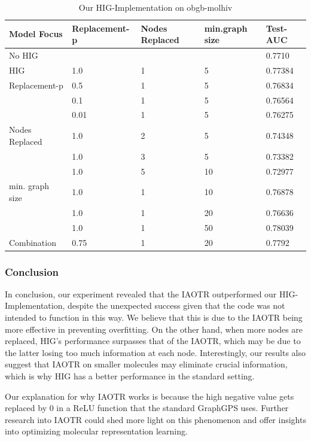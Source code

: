 \begin{table}[ht!]
    \centering
    \begin{tabular}{@{}lllll@{}}
        \toprule
        Model Focus         & Replacement-p     & Nodes Replaced    & min.graph size & Test-AUC \\ \midrule
        No HIG              &                   &                   &                & 0.7710   \\
        HIG                 & 1.0               & 1                 & 5              & 0.77384  \\
        Replacement-p       & 0.5               & 1                 & 5              & 0.76834  \\
                            & 0.1               & 1                 & 5              & 0.76564  \\
                            & 0.01              & 1                 & 5              & 0.76275  \\
        Nodes Replaced      & 1.0               & 2                 & 5              & 0.74348  \\
                            & 1.0               & 3                 & 5              & 0.73382  \\
                            & 1.0               & 5                 & 10             & 0.72977  \\
        min. graph size     & 1.0               & 1                 & 10             & 0.76878  \\
                            & 1.0               & 1                 & 20             & 0.76636  \\
                            & 1.0               & 1                 & 50             & 0.78039  \\
        Combination         & 0.75              & 1                 & 20             & 0.7792   \\ \bottomrule
    \end{tabular}
    \caption{Our HIG-Implementation on obgb-molhiv}
    \label{table:hig_results}
\end{table}

\subsubsection{Conclusion}
In conclusion, our experiment revealed that the IAOTR outperformed our HIG-Implementation, despite the unexpected success given that the code was not intended to function in this way. We believe that this is due to the IAOTR  being more effective in preventing overfitting. On the other hand, when more nodes are replaced, HIG's performance surpasses that of the IAOTR, which may be due to the latter losing too much information at each node. Interestingly, our results also suggest that IAOTR on smaller molecules may eliminate crucial information, which is why HIG has a better performance in the standard setting. 

Our explanation for why IAOTR works is because the high negative value gets replaced by 0 in a ReLU function that the standard GraphGPS \cite{2023graphgps} uses.
Further research into IAOTR could shed more light on this phenomenon and offer insights into optimizing molecular representation learning.
